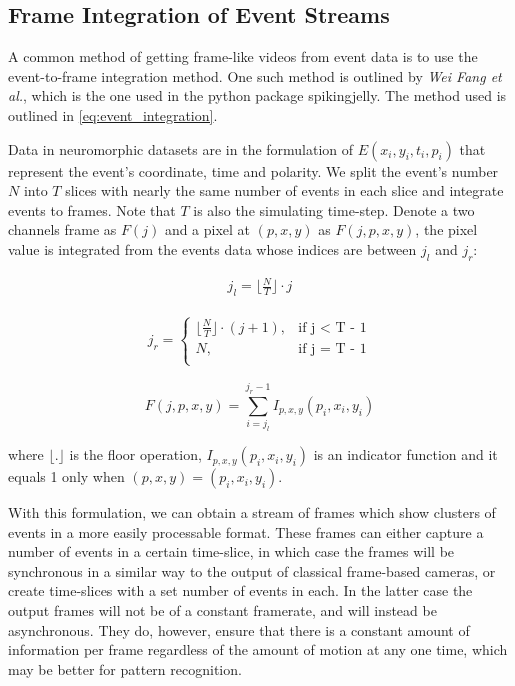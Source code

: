 \subsection{Frame Integration of Event Streams} \label{ssec:frame_integration}

A common method of getting frame-like videos from event data is to use the event-to-frame integration method. One such method is outlined by \textit{Wei Fang et al.}\cite{LearnableMembraneSNN}, which is the one used in the python package spikingjelly\cite{SpikingJelly}. The method used is outlined in \cref{eq:event_integration}.

Data in neuromorphic datasets are in the formulation of $ E(x_i, y_i, t_i, p_i) $ that represent the event's coordinate, time and polarity. We split the event's number $ N $ into $ T $ slices with nearly the same number of events in each slice and integrate events to frames. Note that $ T $ is also the simulating time-step. Denote a two channels frame as $ F(j) $ and a pixel at $ (p, x, y) $ as $ F(j, p, x, y) $, the pixel value is integrated from the events data whose indices are between $ j_l $ and $ j_r $:

\begin{align*}
      j_l = \lfloor \frac{N}{T} \rfloor \cdot j
\end{align*}
 
\begin{align*}
      j_r = \begin{cases}
            \lfloor \frac{N}{T} \rfloor \cdot (j + 1), & \text{if j < T - 1}\\
            N, & \text{if j = T - 1}\\
          \end{cases}
\end{align*}

\begin{equation}
      F(j, p, x, y) = \sum^{j_r -1}_{i=j_l}I_{p, x, y}(p_i, x_i, y_i)
      \label{eq:event_integration}
\end{equation}
 
where $ \lfloor . \rfloor $ is the floor operation, $ I_{p, x, y}(p_i, x_i, y_i) $ is an indicator function and it equals 1 only when $ (p, x, y) = (p_i, x_i, y_i) $.

With this formulation, we can obtain a stream of frames which show clusters of events in a more easily processable format. These frames can either capture a number of events in a certain time-slice, in which case the frames will be synchronous in a similar way to the output of classical frame-based cameras, or create time-slices with a set number of events in each. In the latter case the output frames will not be of a constant framerate, and will instead be asynchronous. They do, however, ensure that there is a constant amount of information per frame regardless of the amount of motion at any one time, which may be better for pattern recognition.

